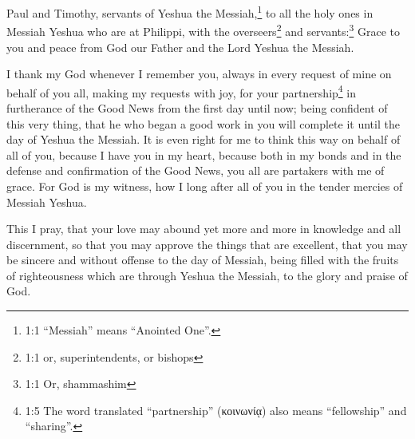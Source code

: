 \newpage
\null
\thispagestyle{empty}
\newpage





\vspace{-1.36in}

\mychapter{} \myverse*{}Paul and Timothy, servants of Yeshua the Messiah,\footnote{1:1 “Messiah” means “Anointed One”.} to all the holy ones in Messiah Yeshua who are at Philippi,
with the overseers\footnote{1:1 or, superintendents, or bishops} and servants:\footnote{1:1 Or, shammashim}
\myverse{}Grace to you and peace from God our Father and the Lord Yeshua the Messiah.

\myverse{}I thank my God whenever I remember you,
\myverse{}always in every request of mine on behalf of you all, making my requests with
joy,
\myverse{}for your partnership\footnote{1:5 The word translated “partnership” (κοινωνίᾳ) also means “fellowship” and “sharing”.}
in furtherance of the Good News from the first day until now;
\myverse{}being confident of this very thing, that he who began a good work in you will
complete it until the day of Yeshua the Messiah.
\myverse{}It is even right for me to think this way on behalf of all of you, because I
have you in my heart, because both in my bonds and in the defense and confirmation of the Good News, you
all are partakers with me of grace.
\myverse{}For God is my witness, how I long after all of you in the tender mercies of
Messiah Yeshua.

\myverse{}This I pray, that your love may abound yet more and more in knowledge
and all discernment,
\myverse{}so that you may approve the things that are excellent, that you may be sincere
and without offense to the day of Messiah,
\myverse{}being filled with the fruits of righteousness which are through Yeshua the Messiah,
to the glory and praise of God.

